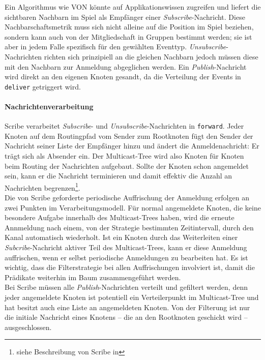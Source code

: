 Ein Algorithmus wie VON könnte auf Applikationswissen zugreifen und liefert die sichtbaren Nachbarn im Spiel als Empfänger einer \emph{Subscribe}-Nachricht. Diese Nachbarschaftsmetrik muss sich nicht alleine auf die Position im Spiel beziehen, sondern kann auch von der Mitgliedschaft in Gruppen bestimmt werden; sie ist aber in jedem Falle spezifisch für den gewählten Eventtyp. \emph{Unsubscribe}-Nachrichten richten sich prinzipiell an die gleichen Nachbarn jedoch müssen diese mit den Nachbarn zur Anmeldung abgeglichen werden. Ein \emph{Publish}-Nachricht wird direkt an den eigenen Knoten gesandt, da die Verteilung der Events in \texttt{deliver} getriggert wird.

\paragraph*{Nachrichtenverarbeitung}
Scribe verarbeitet \emph{Subscribe}- und \emph{Unsubscribe}-Nachrichten in \texttt{forward}. Jeder Knoten auf dem Routingpfad vom Sender zum Rootknoten fügt den Sender der Nachricht seiner Liste der Empfänger hinzu und ändert die Anmeldenachricht: Er trägt sich als Absender ein. Der Multicast-Tree wird also Knoten für Knoten beim Routing der Nachrichten aufgebaut. Sollte der Knoten schon angemeldet sein, kann er die Nachricht terminieren und damit effektiv die Anzahl an Nachrichten begrenzen\footnote{siehe Beschreibung von Scribe in }.\\
Die von Scribe geforderte periodische Auffrischung der Anmeldung erfolgen an zwei Punkten im Verarbeitungsmodell. Für normal angemeldete Knoten, die keine besondere Aufgabe innerhalb des Multicast-Trees haben, wird die erneute Annmeldung nach einem, von der Strategie bestimmten Zeitintervall, durch den Kanal automatisch wiederholt. Ist ein Knoten durch das Weiterleiten einer \emph{Subcribe}-Nachricht aktiver Teil des Multicast-Trees, kann er diese Anmeldung auffrischen, wenn er selbst periodische Anmeldungen zu bearbeiten hat. Es ist wichtig, dass die Filterstrategie bei allen Auffrischungen involviert ist, damit die Prädikate weiterhin im Baum zusammengeführt werden.\\
Bei Scribe müssen alle \emph{Publish}-Nachrichten verteilt und gefiltert werden, denn jeder angemeldete Knoten ist potentiell ein Verteilerpunkt im Multicast-Tree und hat besitzt auch eine Liste an angemeldeten Knoten. Von der Filterung ist nur die initiale Nachricht eines Knotens -- die an den Rootknoten geschickt wird -- ausgeschlossen.

